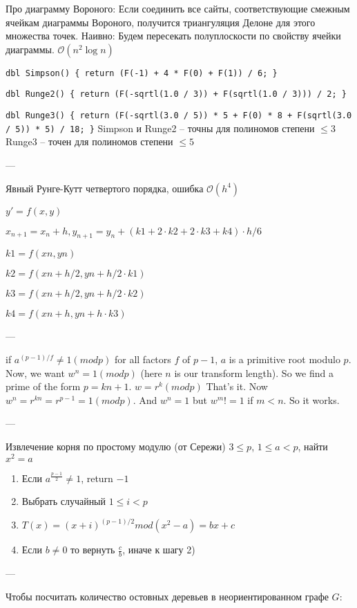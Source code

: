 Про диаграмму Вороного: Если соединить все сайты, соответствующие смежным ячейкам диаграммы Вороного, получится триангуляция Делоне для этого множества точек.
Наивно: Будем пересекать полуплоскости по свойству ячейки диаграммы. $\mathcal{O}(n^2 \log n)$

\texttt{dbl Simpson() \{ return (F(-1) + 4 * F(0) + F(1)) / 6; \}}

\texttt{dbl Runge2() \{ return (F(-sqrtl(1.0 / 3)) + F(sqrtl(1.0 / 3))) / 2; \}}

\texttt{dbl Runge3() \{ return (F(-sqrtl(3.0 / 5)) * 5 + F(0) * 8 + F(sqrtl(3.0 / 5)) * 5) / 18; \}}
Simpson и Runge2 -- точны для полиномов степени $\le 3$
Runge3 -- точен для полиномов степени $\le 5$

---

Явный Рунге-Кутт четвертого порядка, ошибка $\mathcal{O}(h^4)$

$y' = f(x, y)$

$x_{n + 1} = x_n + h, y_{n+1} = y_n + (k1 + 2 \cdot k2 + 2 \cdot k3 + k4) \cdot h / 6$

$k1 = f(xn, yn)$

$k2 = f(xn + h/2, yn + h/2 \cdot k1)$

$k3 = f(xn + h/2, yn + h/2 \cdot k2)$

$k4 = f(xn + h, yn + h \cdot k3)$

---

if $a^{(p-1)/f} \ne 1 (mod p)$ for all factors $f$ of $p-1$, $a$ is a primitive root modulo $p$.
Now, we want $w^n=1 (mod p)$ (here $n$ is our transform length). 
So we find a prime of the form $p=kn+1$.
$w=r^k (mod p)$
That's it. Now $w^n=r^{kn}=r^{p-1}=1 (mod p)$. And $w^n=1$ but $w^m != 1$ if $m < n$. So it works.

---

Извлечение корня по простому модулю (от Сережи)
$3 \leq p$, $1 \leq a < p$, найти $x^2 = a$
\begin{enumerate}
\item Если $a^{\frac{p - 1}{2}} \ne 1$, return $-1$
\item Выбрать случайный $1 \leq i < p$
\item $T(x) = (x + i)^{(p - 1)/2} mod (x^2 - a) = bx + c$
\item Если $b \ne 0$ то вернуть $\frac{c}{b}$, иначе к шагу 2)
\end{enumerate}

---

Чтобы посчитать количество остовных деревьев в неориентированном графе $G$:

